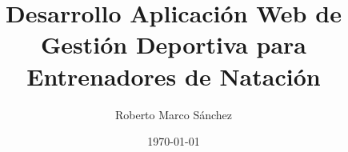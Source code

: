 \documentclass[a4paper,oneside,11pt]{book}
\title{Desarrollo Aplicación Web de Gestión Deportiva para Entrenadores de Natación}
\author{Roberto Marco Sánchez}
\date{\today}
\begin{document}
	\maketitle
	\frontmatter

	\tableofcontents
	\listoffigures
	\listoftables
	
	
	\mainmatter

	
	\nocite{*}	%
	
	
\end{document}
